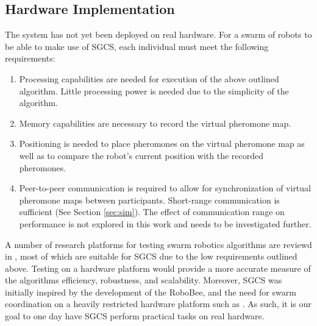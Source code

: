 \subsection{Hardware Implementation}
\label{subsec:hwreq}
The system has not yet been deployed on real hardware. For a swarm of robots to be able to make use of SGCS, each individual must meet the following requirements:
\begin{enumerate}
	\item Processing capabilities are needed for execution of the above outlined algorithm. Little processing power is needed due to the simplicity of the algorithm. 
	\item Memory capabilities are necessary to record the virtual pheromone map.
	\item Positioning is needed to place pheromones on the virtual pheromone map as well as to compare the robot's current position with the recorded pheromones.
	\item Peer-to-peer communication is required to allow for synchronization of virtual pheromone maps between participants. Short-range communication is sufficient (See Section \ref{sec:sim}). The effect of communication range on performance is not explored in this work and needs to be investigated further. 
\end{enumerate}
\par A number of research platforms for testing swarm robotics algorithms are reviewd in \parencite{schranz_swarm_2020}, most of which are suitable for SGCS due to the low requirements outlined above. Testing on a hardware platform would provide a more accurate measure of the algorithms efficiency, robustness, and scalability. Moreover, SGCS was initially inspired by the development of the RoboBee, and the need for swarm coordination on a heavily restricted hardware platform such as \parencite{chen_controlled_2019}. As such, it is our goal to one day have SGCS perform practical tasks on real hardware.

